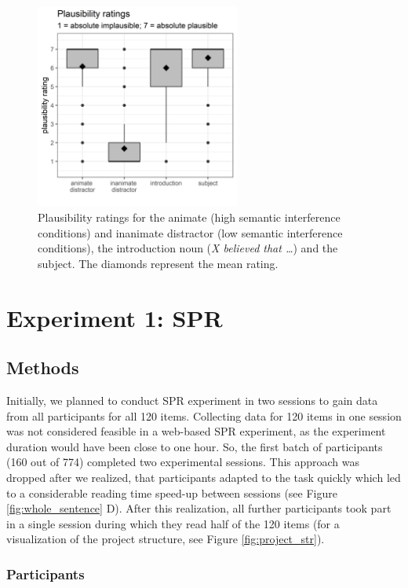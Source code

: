 \documentclass[a4paper, man, floatsintext]{apa7}
\begin{document}
\begin{figure}[H]
\caption{Plausibility ratings for the animate (high semantic interference conditions) and inanimate distractor (low semantic interference conditions), the introduction noun (\textit{X believed that \dots}) and the subject. The diamonds represent the mean rating.}\label{fig:plausibility_rating}
\centering
\includegraphics[width=0.6\textwidth]{images/pandora_plausibility_ratings.jpg}
\end{figure}


\section{Experiment 1: SPR}
\subsection{Methods}
Initially, we planned to conduct SPR experiment in two sessions to gain data from all participants for all 120 items. Collecting data for 120 items in one session was not considered feasible in a web-based SPR experiment, as the experiment duration would have been close to one hour. So, the first batch of participants (160 out of 774) completed two experimental sessions. This approach was dropped after we realized, that participants adapted to the task quickly which led to a considerable reading time speed-up between sessions (see Figure \ref{fig:whole_sentence} D). After this realization, all further participants took part in a single session during which they read half of the 120 items (for a visualization of the project structure, see Figure \ref{fig:project_str}).


\subsubsection{Participants}
\end{document}
